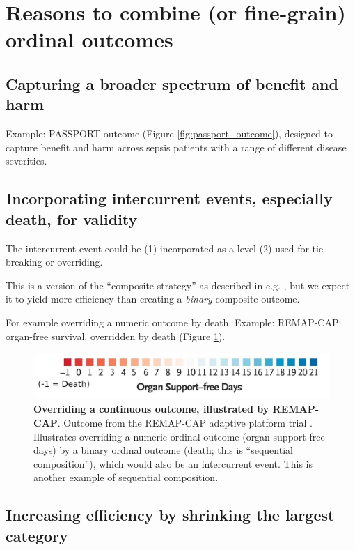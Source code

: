 \documentclass[
  11pt,
  fleqn
]{article}
\begin{document}
\section{Reasons to combine (or fine-grain) ordinal outcomes}

\subsection{Capturing a broader spectrum of benefit and harm}

Example: PASSPORT outcome (Figure \ref{fig:passport_outcome}),
designed to capture benefit and harm across sepsis patients with a
range of different disease severities.

\subsection{Incorporating intercurrent events, especially death,
for validity}

The intercurrent event could be (1) incorporated as a level (2) used
for tie-breaking or overriding.

This is a version of the ``composite strategy'' as described in e.g.
\citet{kahanEstimandsFrameworkPrimer2024}, but we expect it to yield
more efficiency than creating a \emph{binary} composite outcome.

For example overriding a numeric outcome by death.
Example: REMAP-CAP: organ-free survival, overridden by death
(Figure \ref{fig:remap_cap_override}).

\begin{figure}
  \includegraphics[width=5in]{remap_outcome_extra_cropped.jpg}
  \caption{\textbf{Overriding a continuous outcome, illustrated by
    REMAP-CAP}. Outcome from the REMAP-CAP adaptive
    platform trial
    \citep{theremap-capinvestigatorsInterleukin6ReceptorAntagonists2021}.
    Illustrates overriding a numeric ordinal outcome (organ
    support-free days) by a binary ordinal outcome (death; this is
    ``sequential composition''), which
    would also be an intercurrent event. This is another example of
  sequential composition.}
  \label{fig:remap_cap_override}
\end{figure}

\subsection{Increasing efficiency by shrinking the largest category}
\end{document}
